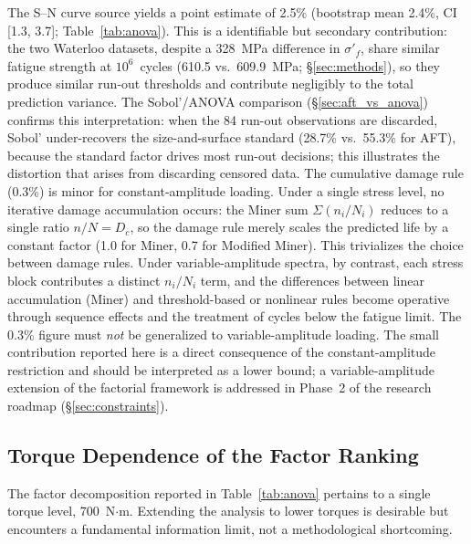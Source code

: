 \documentclass[twocolumn,12pt,a4paper]{article}
\begin{document}
The S--N curve source yields a point estimate of 2.5\% (bootstrap
mean 2.4\%, CI [1.3, 3.7]; Table~\ref{tab:anova}). This is a
identifiable but secondary contribution: the two Waterloo
datasets, despite a 328~MPa difference in $\sigma'_f$, share similar
fatigue strength at $10^6$~cycles (610.5 vs.\ 609.9~MPa; \S\ref{sec:methods}),
so they produce similar run-out thresholds and contribute negligibly
to the total prediction variance. The Sobol'/ANOVA comparison
(\S\ref{sec:aft_vs_anova}) confirms this interpretation: when the 84
run-out observations are discarded, Sobol' under-recovers the
size-and-surface standard (28.7\% vs.\ 55.3\% for AFT), because the
standard factor drives most run-out decisions; this illustrates the
distortion that arises from discarding censored data. The cumulative
damage rule
(0.3\%) is minor for constant-amplitude loading. Under a single
stress level,
no iterative damage accumulation occurs: the Miner sum
$\Sigma(n_i/N_i)$ reduces to a single ratio $n/N = D_c$, so the
damage rule merely scales the predicted life by a constant factor
(1.0 for Miner, 0.7 for Modified Miner). This trivializes the
choice between damage rules. Under variable-amplitude spectra,
by contrast, each stress block contributes a distinct $n_i/N_i$
term, and the differences between linear accumulation (Miner) and
threshold-based or nonlinear rules become operative through sequence
effects and the treatment of cycles below the fatigue limit. The
0.3\% figure must \emph{not} be generalized to
variable-amplitude loading.
The small contribution reported here is a direct consequence of
the constant-amplitude restriction and should be interpreted as a
lower bound; a variable-amplitude extension of the factorial
framework is addressed in Phase~2 of the research roadmap (\S\ref{sec:constraints}).

\subsection{Torque Dependence of the Factor Ranking}
\label{sec:torque}

The factor decomposition reported in Table~\ref{tab:anova} pertains to
a single torque level, 700~N$\cdot$m. Extending the analysis to lower
torques is desirable but encounters a fundamental information limit,
not a methodological shortcoming.
\end{document}
